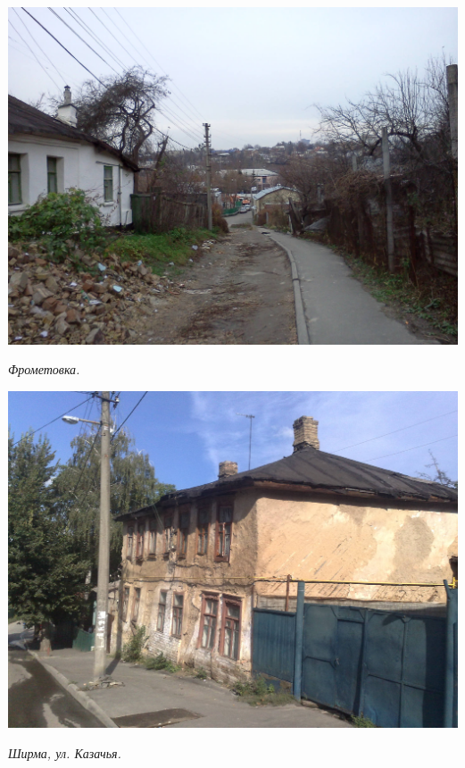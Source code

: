 \begin{center}
\includegraphics[width=\linewidth]{rpix/IMG20101126_003.jpg}

\textit{Фрометовка.}
\end{center}



\begin{center}
\includegraphics[width=\linewidth]{rpix/04092010908.jpg}

\textit{Ширма, ул. Казачья.}
\end{center}




